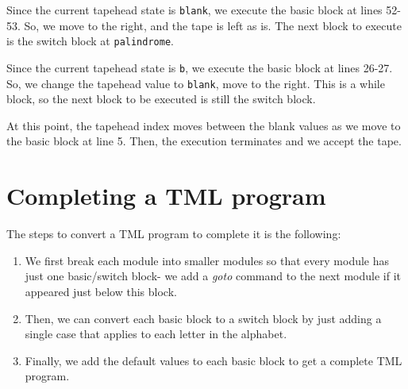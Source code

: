 \noindent Since the current tapehead state is \texttt{blank}, we execute the basic block at lines 52-53. So, we move to the right, and the tape is left as is. The next block to execute is the switch block at \texttt{palindrome}.
\begin{figure}[H]
    \centering
\end{figure}
\noindent Since the current tapehead state is \texttt{b}, we execute the basic block at lines 26-27. So, we change the tapehead value to \texttt{blank}, move to the right. This is a while block, so the next block to be executed is still the switch block.
\begin{figure}[H]
    \centering
\end{figure}
\noindent At this point, the tapehead index moves between the blank values as we move to the basic block at line 5. Then, the execution terminates and we accept the tape.

\section{Completing a TML program}
The steps to convert a TML program to complete it is the following:
\begin{enumerate}
    \item We first break each module into smaller modules so that every module has just one basic/switch block- we add a \textit{goto} command to the next module if it appeared just below this block.
    \item Then, we can convert each basic block to a switch block by just adding a single case that applies to each letter in the alphabet.
    \item Finally, we add the default values to each basic block to get a complete TML program.
\end{enumerate}

